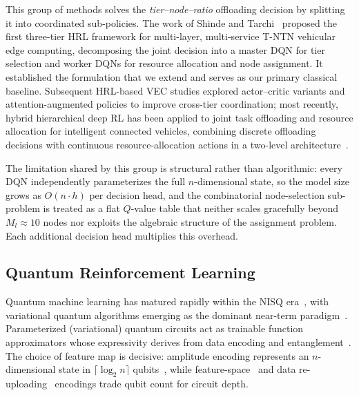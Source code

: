 \documentclass[11pt,a4paper]{article}
\theoremstyle{definition}
\begin{document}
This group of methods solves the \emph{tier--node--ratio} offloading decision by splitting it into coordinated sub-policies. The work of Shinde and Tarchi~\cite{hrl_ntn} proposed the first three-tier HRL framework for multi-layer, multi-service T-NTN vehicular edge computing, decomposing the joint decision into a master DQN for tier selection and worker DQNs for resource allocation and node assignment. It established the formulation that we extend and serves as our primary classical baseline. Subsequent HRL-based VEC studies explored actor--critic variants and attention-augmented policies to improve cross-tier coordination; most recently, hybrid hierarchical deep RL has been applied to joint task offloading and resource allocation for intelligent connected vehicles, combining discrete offloading decisions with continuous resource-allocation actions in a two-level architecture~\cite{liu2025icv}.

The limitation shared by this group is structural rather than algorithmic: every DQN independently parameterizes the full $n$-dimensional state, so the model size grows as $O(n \cdot h)$ per decision head, and the combinatorial node-selection sub-problem is treated as a flat $Q$-value table that neither scales gracefully beyond $M_l \approx 10$ nodes nor exploits the algebraic structure of the assignment problem. Each additional decision head multiplies this overhead.

\subsection{Quantum Reinforcement Learning}
\label{subsec:rw_qrl}

Quantum machine learning has matured rapidly within the NISQ era~\cite{preskill2018nisq}, with variational quantum algorithms emerging as the dominant near-term paradigm~\cite{biamonte2017qml,dunjko2018qml,cerezo2021vqa}. Parameterized (variational) quantum circuits act as trainable function approximators whose expressivity derives from data encoding and entanglement~\cite{benedetti2019pqc,schuld2015intro}. The choice of feature map is decisive: amplitude encoding represents an $n$-dimensional state in $\lceil\log_2 n\rceil$ qubits~\cite{biamonte2017qml}, while feature-space~\cite{havlicek2019feature,schuld2019feature} and data re-uploading~\cite{perezsalinas2020reupload} encodings trade qubit count for circuit depth.
\end{document}

